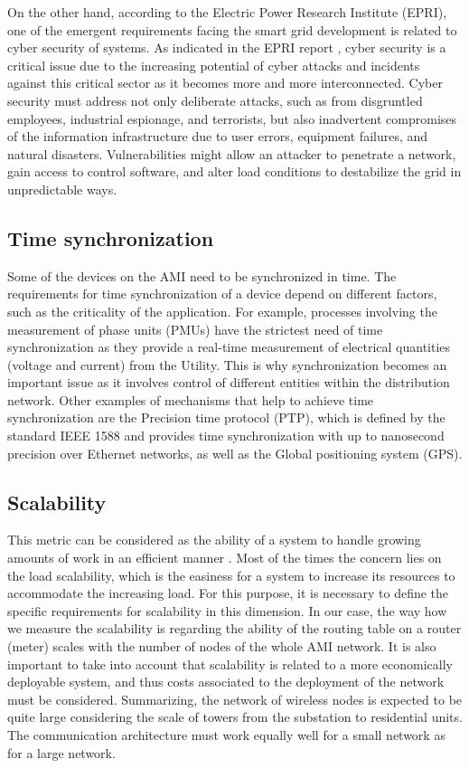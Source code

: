 \documentclass[11pt,draftclsnofoot,onecolumn]{IEEEtran}
\begin{document}
On the other hand, according to the Electric Power Research Institute (EPRI), one of the emergent requirements facing the smart grid development is related to cyber security of systems. As indicated in the EPRI report \cite{EPRI2009}, cyber security is a critical issue due to the increasing potential of cyber attacks and incidents against this critical sector as it becomes more and more interconnected. Cyber security must address not only deliberate attacks, such as from disgruntled employees, industrial espionage, and terrorists, but also inadvertent compromises of the information infrastructure due to user errors, equipment failures, and natural disasters. Vulnerabilities might allow an attacker to penetrate a network, gain access to control software, and alter load conditions to destabilize the grid in unpredictable ways.

\subsection{Time synchronization}
Some of the devices on the AMI need to be synchronized in time. The requirements for time synchronization of a device depend on different factors, such as the criticality of the application. For example, processes involving the measurement of phase units (PMUs) have the strictest need of time synchronization as they provide a real-time measurement of electrical quantities (voltage and current) from the Utility. This is why synchronization becomes an important issue as it involves control of different entities within the distribution network. Other examples of mechanisms that help to achieve time synchronization are the Precision time protocol (PTP), which is defined by the standard IEEE 1588 and provides time synchronization with up to nanosecond precision over Ethernet networks, as well as the Global positioning system (GPS).

\subsection{Scalability}
This metric can be considered as the ability of a system to handle growing amounts of work in an efficient manner \cite{Zhou2012}. Most of the times the concern lies on the load scalability, which is the easiness for a system to increase its resources to accommodate the increasing load. For this purpose, it is necessary to define the specific requirements for scalability in this dimension. In our case, the way how we measure the scalability is regarding the ability of the routing table on a router (meter) scales with the number of nodes of the whole AMI network. It is also important to take into account that scalability is related to a more economically deployable system, and thus costs associated to the deployment of the network must be considered. Summarizing, the network of wireless nodes is expected to be quite large considering the scale of towers from the substation to residential units. The communication architecture must work equally well for a small network as for a large network.
\end{document}
